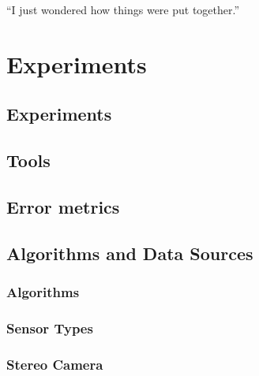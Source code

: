 \begin{savequote}[8cm]
  ``I just wondered how things were put together.''
\end{savequote}
\makeatletter
\chapter{Experiments}
\label{ch:Experiments}

\section{Experiments}



%

\section{Tools}
\label{ToolsSection}


\section{Error metrics}
\label{metricsSection}


\section{Algorithms and Data Sources}
\label{Sec:FVRSOTA}
\subsection{Algorithms} 
\label{AlgorithmsSection}


\subsection{Sensor Types} 
\label{SensorTypesExpsSection}


\subsection{Stereo Camera}
\label{StereoSOTA}


